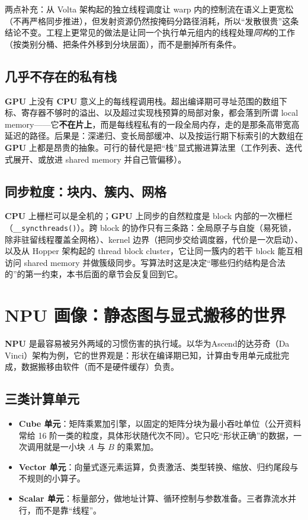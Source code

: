 \documentclass[12pt,a4paper,fontset=fandol]{ctexbook}
\newcommand{\Fn}[1]{\texttt{#1()}}
\newcommand{\Bk}{\allowbreak}
\newcommand{\Dom}[1]{\textsf{\bfseries #1}}
\newcommand{\CPU}{\Dom{CPU}}
\newcommand{\GPU}{\Dom{GPU}}
\newcommand{\NPU}{\Dom{NPU}}
\begin{document}
两点补充：从 Volta 架构起的独立线程调度让 warp 内的控制流在语义上更宽松（不再严格同步推进），但发射资源仍然按掩码分路径消耗，所以``发散很贵''这条结论不变。工程上更常见的做法是让同一个执行单元组内的线程处理\emph{同构}的工作（按类别分桶、把条件外移到分块层面），而不是删掉所有条件。

\subsection{几乎不存在的私有栈}

\GPU{} 上没有 \CPU{} 意义上的每线程调用栈。超出编译期可寻址范围的数组下标、寄存器不够时的溢出、以及超过实现栈预算的局部对象，都会落到所谓 local memory——它\textbf{不在片上}，而是每线程私有的一段全局内存，走的是那条高带宽高延迟的路径。后果是：深递归、变长局部缓冲、以及按运行期下标索引的大数组在 \GPU{} 上都是昂贵的抽象。可行的替代是把``栈''显式搬进算法里（工作列表、迭代式展开、或放进 shared memory 并自己管偏移）。

\subsection{同步粒度：块内、簇内、网格}

\CPU{} 上栅栏可以是全机的；\GPU{} 上同步的自然粒度是 block 内部的一次栅栏（\Fn{\_\_syncthreads\Bk}）。跨 block 的协作只有三条路：全局原子与自旋（易死锁，除非驻留线程覆盖全网格）、kernel 边界（把同步交给调度器，代价是一次启动）、以及从 Hopper 架构起的 thread block cluster，它让同一簇内的若干 block 能互相访问 shared memory 并做簇级同步。写算法时这是决定``哪些归约结构是合法的''的第一约束，本书后面的章节会反复回到它。

\section{NPU 画像：静态图与显式搬移的世界}

\NPU{} 是最容易被另外两域的习惯伤害的执行域。以华为Ascend的达芬奇（Da Vinci）架构为例，它的世界观是：形状在编译期已知，计算由专用单元成批完成，数据搬移由软件（而不是硬件缓存）负责。

\subsection{三类计算单元}

\begin{itemize}
\item \textbf{Cube 单元}：矩阵乘累加引擎，以固定的矩阵分块为最小吞吐单位（公开资料常给 16 阶一类的粒度，具体形状随代次不同）。它只吃``形状正确''的数据，一次调用就是一小块 $A$ 与 $B$ 的乘累加。
\item \textbf{Vector 单元}：向量式逐元素运算，负责激活、类型转换、缩放、归约尾段与不规则的小算子。
\item \textbf{Scalar 单元}：标量部分，做地址计算、循环控制与参数准备。三者靠流水并行，而不是靠``线程''。
\end{itemize}
\end{document}
